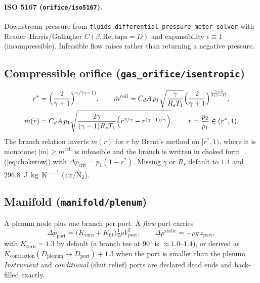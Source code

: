 \documentclass[11pt,a4paper]{article}
\newcommand{\mdot}{\dot{m}}
\newcommand{\code}[1]{\texttt{#1}}
\begin{document}
\paragraph{ISO 5167 (\code{orifice/iso5167}).} Downstream pressure from
\code{fluids.differential\_pressure\_meter\_solver} with Reader--Harris/Gallagher
$C(\beta,\mathrm{Re},\text{taps}=D)$ and expansibility $\epsilon\equiv1$
(incompressible). Infeasible flow raises rather than returning a negative
pressure.

\subsection{Compressible orifice (\code{gas\_orifice/isentropic})}\label{sec:gasorifice}
\begin{align}
  r^* &= \Bigl(\frac{2}{\gamma+1}\Bigr)^{\gamma/(\gamma-1)},\qquad
  \mdot^{\mathrm{ceil}} = C_dA\,p_1\sqrt{\frac{\gamma}{R_sT_1}}\Bigl(\frac{2}{\gamma+1}\Bigr)^{\frac{\gamma+1}{2(\gamma-1)}},\\
  \mdot(r) &= C_dA\,p_1\sqrt{\frac{2\gamma}{(\gamma-1)R_sT_1}\Bigl(r^{2/\gamma}-r^{(\gamma+1)/\gamma}\Bigr)},
  \qquad r=\frac{p_2}{p_1}\in(r^*,1).
\end{align}
The branch relation inverts $\mdot(r)$ for $r$ by Brent's method on
$[r^*,1)$, where it is monotone; $|\mdot|\ge\mdot^{\mathrm{ceil}}$ is
infeasible and the branch is written in choked form (\cref{eq:chokerow}) with
$\Delta p_{\mathrm{crit}} = p_1(1-r^*)$. Missing $\gamma$ or $R_s$ default to
$1.4$ and \SI{296.8}{\joule\per\kilogram\per\kelvin} (air/N$_2$).

\subsection{Manifold (\code{manifold/plenum})}\label{sec:manifold}
A plenum node plus one branch per port. A \emph{flow} port carries
\begin{equation}
  \Delta p_{\mathrm{port}} = \bigl(K_{\mathrm{turn}}+K_{\mathrm{fit}}\bigr)\tfrac12\rho V_{\mathrm{port}}^2,
  \qquad
  \Delta p^{\mathrm{static}} = -\rho g\,z_{\mathrm{port}},
\end{equation}
with $K_{\mathrm{turn}}=1.3$ by default (a branch tee at 90$^\circ$ is $\approx1.0$--$1.4$),
or derived as $K_{\mathrm{contraction}}(D_{\mathrm{plenum}}\!\to\!D_{\mathrm{port}}) + 1.3$
when the port is smaller than the plenum. \emph{Instrument} and \emph{conditional}
(shut relief) ports are declared dead ends and back-filled exactly.
\end{document}

